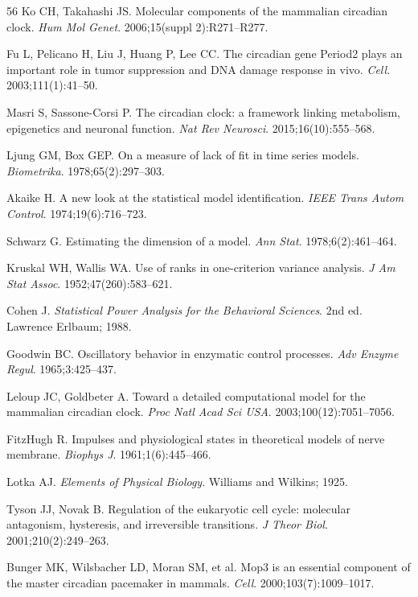 \documentclass[11pt,letterpaper]{article}
\begin{document}
\begin{thebibliography}{56}
Ko CH, Takahashi JS.
Molecular components of the mammalian circadian clock.
\textit{Hum Mol Genet}. 2006;15(suppl 2):R271--R277.

Fu L, Pelicano H, Liu J, Huang P, Lee CC.
The circadian gene Period2 plays an important role in tumor suppression and DNA damage response in vivo.
\textit{Cell}. 2003;111(1):41--50.

Masri S, Sassone-Corsi P.
The circadian clock: a framework linking metabolism, epigenetics and neuronal function.
\textit{Nat Rev Neurosci}. 2015;16(10):555--568.

Ljung GM, Box GEP.
On a measure of lack of fit in time series models.
\textit{Biometrika}. 1978;65(2):297--303.

Akaike H.
A new look at the statistical model identification.
\textit{IEEE Trans Autom Control}. 1974;19(6):716--723.

Schwarz G.
Estimating the dimension of a model.
\textit{Ann Stat}. 1978;6(2):461--464.

Kruskal WH, Wallis WA.
Use of ranks in one-criterion variance analysis.
\textit{J Am Stat Assoc}. 1952;47(260):583--621.

Cohen J.
\textit{Statistical Power Analysis for the Behavioral Sciences}. 2nd ed. Lawrence Erlbaum; 1988.

Goodwin BC.
Oscillatory behavior in enzymatic control processes.
\textit{Adv Enzyme Regul}. 1965;3:425--437.

Leloup JC, Goldbeter A.
Toward a detailed computational model for the mammalian circadian clock.
\textit{Proc Natl Acad Sci USA}. 2003;100(12):7051--7056.

FitzHugh R.
Impulses and physiological states in theoretical models of nerve membrane.
\textit{Biophys J}. 1961;1(6):445--466.

Lotka AJ.
\textit{Elements of Physical Biology}. Williams and Wilkins; 1925.

Tyson JJ, Novak B.
Regulation of the eukaryotic cell cycle: molecular antagonism, hysteresis, and irreversible transitions.
\textit{J Theor Biol}. 2001;210(2):249--263.

Bunger MK, Wilsbacher LD, Moran SM, et al.
Mop3 is an essential component of the master circadian pacemaker in mammals.
\textit{Cell}. 2000;103(7):1009--1017.


\end{thebibliography}
\end{document}
